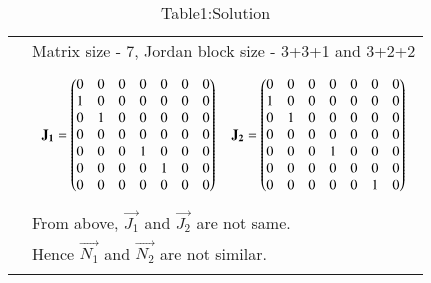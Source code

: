 \documentclass[journal,12pt]{IEEEtran}
\begin{document}
\begin{longtable}{|p{5cm}|p{13cm}|}
& Matrix size - 7, Jordan block size - 3+3+1 and 3+2+2\\
& \parbox{10cm}{\begin{align}
    \mathbf{J_1} = \begin{pmatrix}0&0&0&0&0&0&0\\1&0&0&0&0&0&0\\0&1&0&0&0&0&0\\0&0&0&0&0&0&0\\0&0&0&1&0&0&0\\0&0&0&0&1&0&0\\0&0&0&0&0&0&0\end{pmatrix} \quad 
    \mathbf{J_2} = \begin{pmatrix}0&0&0&0&0&0&0\\1&0&0&0&0&0&0\\0&1&0&0&0&0&0\\0&0&0&0&0&0&0\\0&0&0&1&0&0&0\\0&0&0&0&0&0&0\\0&0&0&0&0&1&0\end{pmatrix} 
\end{align}}\\
& From above, $\vec{J_1}$ and $\vec{J_2}$ are not same.\\
&Hence $\vec{N_1}$ and $\vec{N_2}$ are not similar.\\
\hline
\caption*{Table1:Solution}
\end{longtable}
\end{document}
